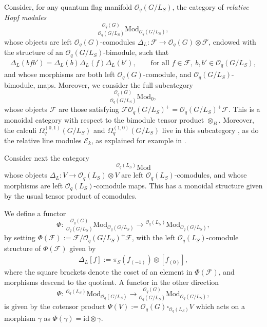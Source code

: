 \documentclass[10pt,a4paper]{amsart}
\numberwithin{equation}{section}
\begin{document}
Consider, for any quantum flag manifold $\mathcal{O}_q(G/L_S)$, the category of \emph{relative Hopf modules}
\[
{}^{~~~\,\mathcal{O}_q(G)}_{\mathcal{O}_q(G/L_S)}\mathrm{Mod}_{\mathcal{O}_q(G/L_S)},
\]
whose objects are left \mbox{$\mathcal{O}_q(G)$-comodules} $\Delta_L\colon \mathcal{F} \to \mathcal{O}_q(G) \otimes \mathcal{F}$, endowed with the structure of an $\mathcal{O}_q(G/L_S)$-bimodule, such that
\begin{gather*}
\Delta_L(bfb') = \Delta_L(b)\Delta_L(f)\Delta_L(b'), \qquad \textrm{for all } f \in \mathcal{F},\ b,b' \in \mathcal{O}_q(G/L_S),
\end{gather*}
and whose morphisms are both left $\mathcal{O}_q(G)$-comodule, and $\mathcal{O}_q(G/L_S)$-bimodule, maps. Moreover, we consider the full subcategory
\[
{}^{~~~\,\mathcal{O}_q(G)}_{\mathcal{O}_q(G/L_S)}\mathrm{Mod}_{0},
\]
whose objects $\mathcal{F}$ are those satisfying $\mathcal{F} \mathcal{O}_q(G/L_S)^+ = \mathcal{O}_q(G/L_S)^+\mathcal{F}$. This is a monoidal category with respect to the bimodule tensor product $\otimes_B$. Moreover, the calculi $\Omega^{(0,1)}_q(G/L_S)$ and $\Omega^{(1,0)}_q(G/L_S)$ live in this subcategory \cite[Proposition 3.3]{HKdR}, as do the relative line modules $\mathcal{E}_k$, as explained for example in \cite[Appendix A.3]{GAPP}.

Consider next the category
\[
{}^{\mathcal{O}_q(L_S)}\mathrm{Mod}
\]
whose objects $\Delta_L\colon V \to \mathcal{O}_q(L_S) \otimes V$ are left \mbox{$\mathcal{O}_q(L_S)$-comodules}, and whose morphisms are left $\mathcal{O}_q(L_S)$-comodule maps. This has a monoidal structure given by the usual tensor product of comodules.

We define a functor
\[
\Phi\colon \ {}^{~~~\,\mathcal{O}_q(G)}_{\mathcal{O}_q(G/L_S)}\mathrm{Mod}_{\mathcal{O}_q(G/L_S)} \to {}^{\mathcal{O}_q(L_S)}\mathrm{Mod}_{\mathcal{O}_q(G/L_S)},
\]
by setting $\Phi(\mathcal{F}) := \mathcal{F}/\mathcal{O}_q(G/L_S)^+\mathcal{F}$,
with the left $\mathcal{O}_q(L_S)$-comodule structure of $\Phi(\mathcal{\mathcal{F}})$ given by
\begin{gather*}
\Delta_L[f] := \pi_S(f_{(-1)})\otimes [f_{(0)}],
\end{gather*}
where the square brackets denote the coset of an element in $\Phi(\mathcal{\mathcal{F}})$, and morphisms descend to the quotient. A functor in the other direction
\[
\Psi\colon \ {}^{\mathcal{O}_q(L_S)}\mathrm{Mod}_{\mathcal{O}_q(G/L_S)} \to {}^{~~~\,\mathcal{O}_q(G)}_{\mathcal{O}_q(G/L_S)}\mathrm{Mod}_{\mathcal{O}_q(G/L_S)},
\]
is given by the cotensor product
$\Psi(V) := \mathcal{O}_q(G) \square_{\mathcal{O}_q(L_S)} V$
which acts on a morphism $\gamma$ as $\Phi(\gamma) = \mathrm{id} \otimes \gamma$.
\end{document}

